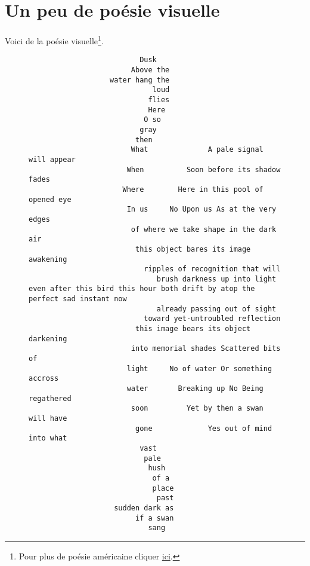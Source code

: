 \chapter{Un peu de poésie visuelle}

Voici de la poésie visuelle\footnote{Pour plus de poésie
        américaine cliquer \href{https://amzn.to/2F96Hs0}{ici}.}.
\begin{center}
  \begin{figure}[h]
    \centering
    {\small
\begin{verbatim}
                          Dusk
                        Above the
                   water hang the
                             loud
                            flies
                            Here
                           O so
                          gray
                         then
                        What              A pale signal will appear
                       When          Soon before its shadow fades
                      Where        Here in this pool of opened eye
                       In us     No Upon us As at the very edges
                        of where we take shape in the dark air
                         this object bares its image awakening
                           ripples of recognition that will
                              brush darkness up into light
even after this bird this hour both drift by atop the perfect sad instant now
                              already passing out of sight
                           toward yet-untroubled reflection
                         this image bears its object darkening
                        into memorial shades Scattered bits of
                       light     No of water Or something accross
                       water       Breaking up No Being regathered
                        soon         Yet by then a swan will have 
                         gone             Yes out of mind into what
                          vast 
                           pale
                            hush
                             of a 
                             place 
                              past 
                    sudden dark as
                         if a swan
                            sang
\end{verbatim}
      }

    \caption[]{\href{https://emacs.stackexchange.com/questions/18011/poem-in-org-mode-verse-environment-mangled-by-latex-export}{}}
    \label{fig:swan}
  \end{figure}
\end{center}

